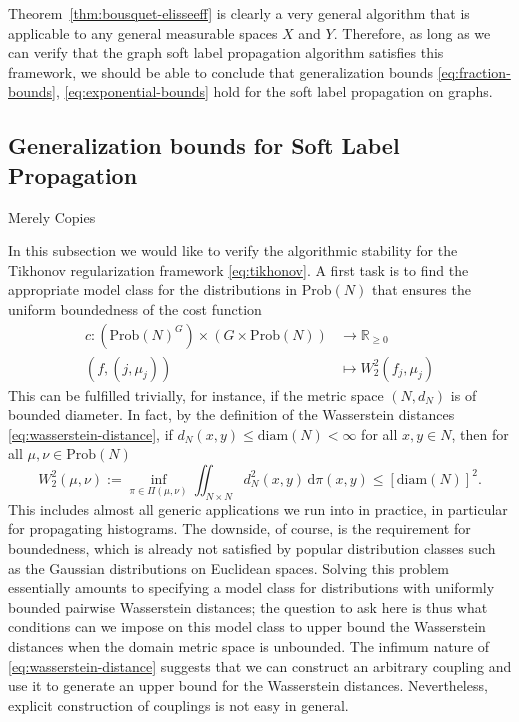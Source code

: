\documentclass[letterpaper]{article} %
\begin{document}
Theorem~\ref{thm:bousquet-elisseeff} is clearly a very general algorithm that is applicable to any general measurable spaces $X$ and $Y$. Therefore, as long as we can verify that the graph soft label propagation algorithm satisfies this framework, we should be able to conclude that generalization bounds \eqref{eq:fraction-bounds}, \eqref{eq:exponential-bounds} hold for the soft label propagation on graphs.




\subsection{Generalization bounds for Soft Label Propagation} 
{\color{red}Merely Copies}

In this subsection we would like to verify the algorithmic stability for the Tikhonov regularization framework \eqref{eq:tikhonov}. A first task is to find the appropriate model class for the distributions in $\mathrm{Prob}\left( N \right)$ that ensures the uniform boundedness of the cost function
\begin{equation}
  \label{eq:wasserstein-cost-func}
  \begin{aligned}
    c:\left( \mathrm{Prob}\left( N \right)^G \right)\times \left( G\times \mathrm{Prob}\left( N \right) \right)&\rightarrow\mathbb{R}_{\geq 0}\\
    \left( f, \left( j,\mu_j \right) \right)&\mapsto W_2^2 \left( f_j,\mu_j \right)
  \end{aligned}
\end{equation}
This can be fulfilled trivially, for instance, if the metric space $\left( N,d_N \right)$ is of bounded diameter. In fact, by the definition of the Wasserstein distances \eqref{eq:wasserstein-distance}, if $d_N \left( x,y \right)\leq \mathrm{diam}\left( N \right)<\infty$ for all $x,y\in N$, then for all $\mu,\nu\in \mathrm{Prob}\left( N \right)$
\begin{equation*}
  W_2^2 \left( \mu,\nu \right):=\inf_{\pi\in\Pi \left( \mu,\nu \right)}\iint_{N\times N}d^2_N \left( x,y \right)\,\mathrm{d}\pi \left( x,y \right)\leq \left[\mathrm{diam}\left( N \right)\right]^2.
\end{equation*}
This includes almost all generic applications we run into in practice, in particular for propagating histograms. The downside, of course, is the requirement for boundedness, which is already not satisfied by popular distribution classes such as the Gaussian distributions on Euclidean spaces. Solving this problem essentially amounts to specifying a model class for distributions with uniformly bounded pairwise Wasserstein distances; the question to ask here is thus what conditions can we impose on this model class to upper bound the Wasserstein distances when the domain metric space is unbounded. The infimum nature of \eqref{eq:wasserstein-distance} suggests that we can construct an arbitrary coupling and use it to generate an upper bound for the Wasserstein distances. Nevertheless, explicit construction of couplings is not easy in general.
\end{document}
